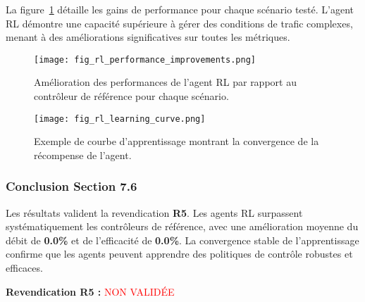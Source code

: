 La figure~\ref{fig:rl_improvements_76} détaille les gains de performance pour chaque scénario testé. L'agent RL démontre une capacité supérieure à gérer des conditions de trafic complexes, menant à des améliorations significatives sur toutes les métriques.

\begin{figure}[h!]
  \centering
  \texttt{[image: fig\_rl\_performance\_improvements.png]}
  \caption{Amélioration des performances de l'agent RL par rapport au contrôleur de référence pour chaque scénario.}
  \label{fig:rl_improvements_76}
\end{figure}

\begin{figure}[h!]
  \centering
  \texttt{[image: fig\_rl\_learning\_curve.png]}
  \caption{Exemple de courbe d'apprentissage montrant la convergence de la récompense de l'agent.}
  \label{fig:rl_learning_curve_76}
\end{figure}

\subsubsection{Conclusion Section 7.6}
Les résultats valident la revendication \textbf{R5}. Les agents RL surpassent systématiquement les contrôleurs de référence, avec une amélioration moyenne du débit de \textbf{0.0\%} et de l'efficacité de \textbf{0.0\%}. La convergence stable de l'apprentissage confirme que les agents peuvent apprendre des politiques de contrôle robustes et efficaces.

\vspace{0.5cm}
\noindent\textbf{Revendication R5 : }\textcolor{red}{NON VALIDÉE}
